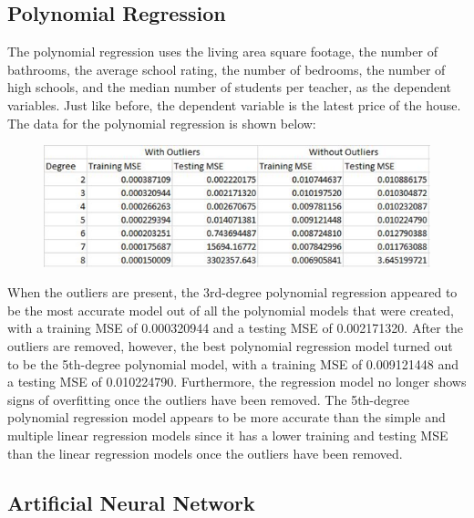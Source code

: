 \documentclass[12pt]{article}
\begin{document}
	\subsection{Polynomial Regression}
	
	The polynomial regression uses the living area square footage, the number of bathrooms, the average school rating, the number of bedrooms, the number of high schools, and the median number of students per teacher, as the dependent variables. Just like before, the dependent variable is the latest price of the house. The data for the polynomial regression is shown below:
	
	\begin{figure}[H]
		\label{fig:fig4}
		\includegraphics[width=1\linewidth]{fig4}
	\end{figure}
	
	When the outliers are present, the 3rd-degree polynomial regression appeared to be the most accurate model out of all the polynomial models that were created, with a training MSE of 0.000320944 and a testing MSE of 0.002171320. After the outliers are removed, however, the best polynomial regression model turned out to be the 5th-degree polynomial model, with a training MSE of 0.009121448 and a testing MSE of 0.010224790. Furthermore, the regression model no longer shows signs of overfitting once the outliers have been removed. The 5th-degree polynomial regression model appears to be more accurate than the simple and multiple linear regression models since it has a lower training and testing MSE than the linear regression models once the outliers have been removed.
	
	
	\subsection{Artificial Neural Network}
	
\end{document}
